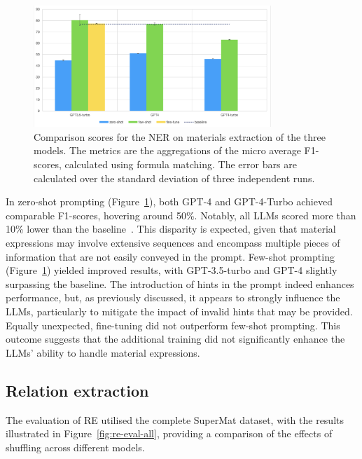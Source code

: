 \documentclass[a4paper]{article}
\begin{document}
\begin{figure}[htbp]
  \centering
  \includegraphics[width=0.8\textwidth]{figures/ner-supermat-all.png} 
  \caption{Comparison scores for the NER on materials extraction of the three models. The metrics are the aggregations of the micro average F1-scores, calculated using formula matching. The error bars are calculated over the standard deviation of three independent runs.}
  \label{fig:ner-materials-all}
\end{figure}

In zero-shot prompting (Figure~\ref{fig:ner-materials-all}), both GPT-4 and GPT-4-Turbo achieved comparable F1-scores, hovering around 50\%. Notably, all LLMs scored more than 10\% lower than the baseline~\cite{lfoppiano2023automatic}. This disparity is expected, given that material expressions may involve extensive sequences and encompass multiple pieces of information that are not easily conveyed in the prompt.
Few-shot prompting (Figure~\ref{fig:ner-materials-all}) yielded improved results, with GPT-3.5-turbo and GPT-4 slightly surpassing the baseline. 
The introduction of hints in the prompt indeed enhances performance, but, as previously discussed, it appears to strongly influence the LLMs, particularly to mitigate the impact of invalid hints that may be provided.
Equally unexpected, fine-tuning did not outperform few-shot prompting. This outcome suggests that the additional training did not significantly enhance the LLMs' ability to handle material expressions.

\subsection{Relation extraction}
\label{sec:results-re}

The evaluation of RE utilised the complete SuperMat dataset, with the results illustrated in Figure~\ref{fig:re-eval-all}, providing a comparison of the effects of shuffling across different models. 
\end{document}

